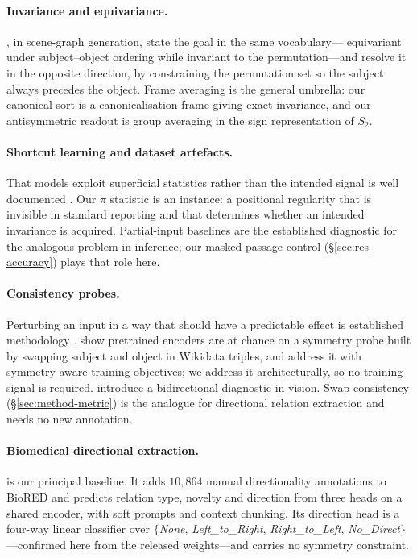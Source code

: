 \documentclass[11pt]{article}
\begin{document}
\paragraph{Invariance and equivariance.}
\citet{woo2022login}, in scene-graph generation, state the goal in the same vocabulary---%
equivariant under subject--object ordering while invariant to the permutation---and resolve it
in the opposite direction, by constraining the permutation set so the subject always precedes
the object. Frame averaging \citep{puny2022frame} is the general umbrella: our canonical sort
is a canonicalisation frame giving exact invariance, and our antisymmetric readout is group
averaging in the sign representation of $S_2$.

\paragraph{Shortcut learning and dataset artefacts.}
That models exploit superficial statistics rather than the intended signal is well documented
\citep{gururangan2018annotation,mccoy2019right,geirhos2020shortcut}. Our $\pi$ statistic is an
instance: a positional regularity that is invisible in standard reporting and that determines
whether an intended invariance is acquired. Partial-input baselines \citep{poliak2018hypothesis}
are the established diagnostic for the analogous problem in inference; our masked-passage
control (\S\ref{sec:res-accuracy}) plays that role here.

\paragraph{Consistency probes.}
Perturbing an input in a way that should have a predictable effect is established methodology
\citep{ribeiro2020checklist,elazar2021measuring}. \citet{yuan2025symmetry} show pretrained
encoders are at chance on a symmetry probe built by swapping subject and object in Wikidata
triples, and address it with symmetry-aware training objectives; we address it architecturally,
so no training signal is required. \citet{woo2022login} introduce a bidirectional diagnostic in
vision. Swap consistency (\S\ref{sec:method-metric}) is the analogue for directional relation
extraction and needs no new annotation.

\paragraph{Biomedical directional extraction.}
\citet{lai2025directionality} is our principal baseline. It adds $10{,}864$ manual
directionality annotations to BioRED \citep{luo2022biored} and predicts relation type, novelty
and direction from three heads on a shared encoder, with soft prompts and context chunking. Its
direction head is a four-way linear classifier over $\{$\emph{None}, \emph{Left\_to\_Right},
\emph{Right\_to\_Left}, \emph{No\_Direct}$\}$---confirmed here from the released weights---and
carries no symmetry constraint.
\end{document}
